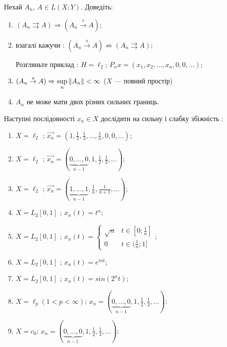 \begin{exercise}
    Нехай $A_n$, $A \in L(X; Y)$. Доведіть: 
    \begin{enumerate}
        \item $(A_n \rightrightarrows A) \Rightarrow (A_n 
        \overset{s}{\rightarrow} A)$;
        \item взагалі кажучи : $(A_n 
        \overset{s}{\rightarrow} A) \nRightarrow (A_n \rightrightarrows A)$;

        Розгляньте приклад : $H = \ell_2$; $P_nx = (x_1, x_2, ..., x_n, 0, 0, ...)$;

        \item $(A_n \overset{s}{\rightarrow} A) \Rightarrow \underset{n}{\sup}\left\lVert A_n\right\rVert 
        < \infty$ ($X$ --- повний простір)

        \item $A_n$ не може мати двох різних сильних границь.
    \end{enumerate}
\end{exercise}

\begin{exercise}
    Наступні послідовності $x_n \in X$ дослідити на сильну і слабку збіжність : 
    \begin{enumerate}
        \item $X = \ell_2$ ; $\vec{x_n} = (1, \frac{1}{2}, \frac{1}{3}, ..., \frac{1}{n}, 0, 0
        , ...)$;
        \item $X = \ell_2$ ; $\vec{x_n} = ( \underbrace{0, ..., 0}_{n-1} ,
        1, \frac{1}{2}, \frac{1}{3}, ...)$;
        \item $X = \ell_2$ ; $\vec{x_n} = ( \underbrace{1, ..., 1}_{n-1} ,
        \frac{1}{n}, \frac{1}{n+1}, ...)$;
        \item $X = L_2[0, 1]$ ; $x_n(t) = t^n$;
        \item $X = L_2[0, 1]$ ; $x_n(t) =  \begin{cases}
            \sqrt{n} & t \in [0; \frac{1}{n}] \\
            0 & t \in (\frac{1}{n}; 1]
        \end{cases}$;
        \item $X = L_2[0, 1]$ ; $x_n(t) = e^{int}$;
        \item $X = L_2[0, 1]$ ; $x_n(t) = sin(2^nt)$;
        \item $X = \ell_p (1 < p < \infty)$; $x_n = ( \underbrace{0, ..., 0}_{n-1} ,
        1, \frac{1}{2}, \frac{1}{3}, ...)$;
        \item $X = c_0$; $x_n = ( \underbrace{0, ..., 0}_{n-1} ,
        1, \frac{1}{2}, \frac{1}{3}, ...)$;
    \end{enumerate}
\end{exercise}